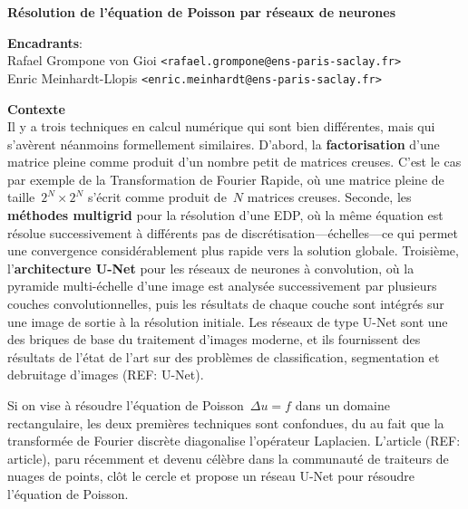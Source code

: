 \documentclass[a4paper,11pt]{article}
\begin{document}
\thispagestyle{empty}

{\bf
	Résolution de l'équation de Poisson par réseaux de neurones
}

{\bf Encadrants}:\\
Rafael Grompone von Gioi \verb+<rafael.grompone@ens-paris-saclay.fr>+\\
Enric Meinhardt-Llopis \verb+<enric.meinhardt@ens-paris-saclay.fr>+

{\bf Contexte}\\
Il y a trois techniques en calcul numérique qui sont bien différentes, mais qui
s'avèrent néanmoins formellement similaires.  D'abord, la {\bf factorisation}
d'une matrice pleine comme produit d'un nombre petit de matrices creuses.
C'est le cas par exemple de la Transformation de Fourier Rapide, où une matrice
pleine de taille~$2^N\times2^N$ s'écrit comme produit de~$N$ matrices creuses.
Seconde, les {\bf méthodes multigrid} pour la résolution d'une EDP, où la même
équation est résolue successivement à différents pas de
discrétisation---échelles---ce qui permet une convergence considérablement plus
rapide vers la solution globale.  Troisième, l'{\bf architecture U-Net} pour
les réseaux de neurones à convolution, où la pyramide multi-échelle d'une image
est analysée successivement par plusieurs couches convolutionnelles, puis les
résultats de chaque couche sont intégrés sur une image de sortie à la résolution
initiale.  Les réseaux de type U-Net sont une des briques de base du traitement
d'images moderne, et ils fournissent des résultats de l'état de l'art sur des
problèmes de classification, segmentation et debruitage d'images (REF: U-Net).

Si on vise à résoudre l'équation de Poisson~$\Delta u = f$ dans un domaine
rectangulaire, les deux premières techniques sont confondues, du au fait que la
transformée de Fourier discrète diagonalise l'opérateur Laplacien.
L'article (REF: article), paru récemment et devenu célèbre dans la communauté
de traiteurs de nuages de points, clôt le cercle et propose un réseau U-Net
pour résoudre l'équation de Poisson.
\end{document}
